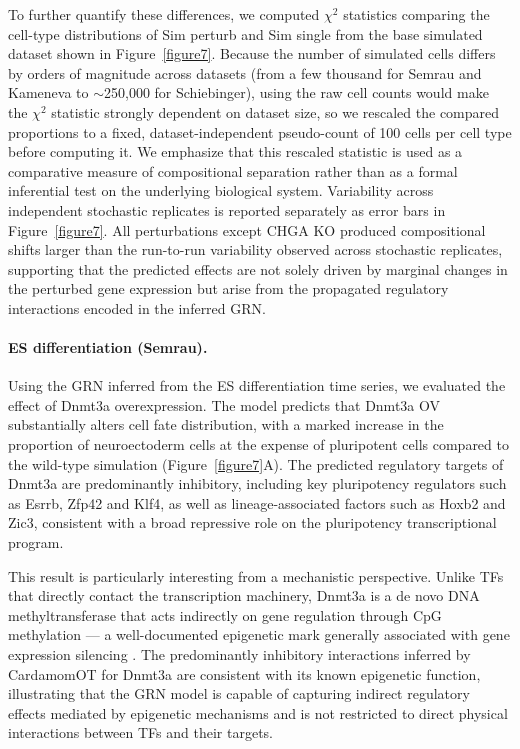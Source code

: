 \documentclass[a4paper, 11pt]{article}
\theoremstyle{plain}
\theoremstyle{remark}
\newcommand*{\firstreview}[1]{{\color{black}#1}}
\begin{document}
To further quantify these differences, we computed
$\chi^2$ statistics comparing the cell-type distributions of Sim perturb and Sim single
from the base simulated dataset shown in Figure~\ref{figure7}.
Because the number of simulated cells differs by orders of magnitude across datasets
(from a few thousand for Semrau and Kameneva to $\sim$250{,}000 for Schiebinger),
using the raw cell counts would make the $\chi^2$ statistic strongly dependent on dataset
size, so we rescaled the compared proportions to a fixed, dataset-independent
pseudo-count of 100 cells per cell type before computing it. We emphasize that this rescaled statistic is used as a comparative measure of
compositional separation rather than as a formal inferential test on the underlying
biological system.
Variability across independent stochastic replicates is reported separately as
error bars in Figure~\ref{figure7}.
All perturbations except CHGA KO produced compositional shifts larger than the run-to-run variability observed across stochastic replicates, supporting that the
predicted effects are not solely driven by marginal changes in the perturbed gene expression
but arise from the propagated regulatory interactions encoded in the inferred GRN.


\paragraph{ES differentiation (Semrau).}
Using the GRN inferred from the ES differentiation time series, we evaluated 
the effect of {Dnmt3a} overexpression. The model predicts that {Dnmt3a} 
OV substantially alters cell fate distribution, with a marked increase in the 
proportion of neuroectoderm cells at the expense of pluripotent cells compared 
to the wild-type simulation (Figure~\ref{figure7}A). The predicted regulatory 
targets of {Dnmt3a} are predominantly inhibitory, including key pluripotency 
regulators such as {Esrrb}, {Zfp42} and {Klf4}, as well as 
lineage-associated factors such as {Hoxb2} and {Zic3}, consistent 
with a broad repressive role on the pluripotency transcriptional program.

This result is particularly interesting from a mechanistic perspective. Unlike 
\firstreview{TFs} that directly contact the transcription machinery, {Dnmt3a} 
is a de novo DNA methyltransferase that acts indirectly on gene regulation through 
CpG methylation — a well-documented epigenetic mark generally associated with 
gene expression silencing \cite{bird2002dna}. The predominantly inhibitory interactions 
inferred by CardamomOT for {Dnmt3a} are consistent with its known epigenetic 
function, illustrating that the GRN model is capable of capturing indirect 
regulatory effects mediated by epigenetic mechanisms and is not restricted to 
direct physical interactions between \firstreview{TFs} and their targets.
\end{document}
